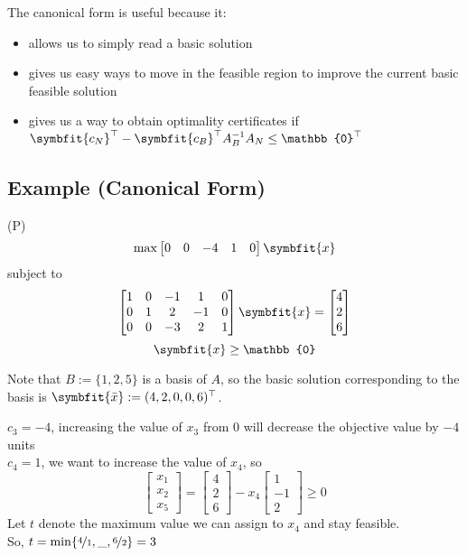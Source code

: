 The canonical form is useful because it:
\begin{itemize}
    \item allows us to simply read a basic solution
    \item gives us easy ways to move in the feasible region to improve the current basic
    feasible solution
    \item gives us a way to obtain optimality certificates if
    $\symbfit{c_N}^\top -\symbfit{c_B}^\top A_B^{-1}A_N\le \mathbb{0}^\top $
\end{itemize}

\subsection{Example (Canonical Form)}
(P)
\[\max \begin{bmatrix}
    0 & 0 & -4 & 1 & 0
\end{bmatrix}\symbfit{x}\]
subject to
\[
    \begin{bmatrix}
        1 & 0 & -1 & 1 & 0\\
        0 & 1 & 2 & -1 & 0\\
        0 & 0 & -3 & 2 & 1
    \end{bmatrix}\symbfit{x}
    =
    \begin{bmatrix}
        4\\
        2\\
        6
    \end{bmatrix} \]
\[ \symbfit{x}\ge \mathbb{0} \]

Note that $B:=\{1,2,5\}$ is a basis of $A$, so the basic solution corresponding to the
basis is
$\symbfit{\bar{x}}:=(4,2,0,0,6)^\top$.

$c_3=-4$, increasing the value of $x_3$ from $0$ will decrease the objective value by $-4$ units\\
$c_4=1$, we want to increase the value of $x_4$, so
\[
    \begin{bmatrix}
        x_1\\
        x_2\\
        x_5
    \end{bmatrix}
    =
    \begin{bmatrix}
        4\\
        2\\
        6
    \end{bmatrix}
    -x_4
    \begin{bmatrix}
        1\\
        -1\\
        2
    \end{bmatrix}
    \ge 0
\]
Let $t$ denote the maximum value we can assign to $x_4$ and stay feasible.\\
So,
$t=\min\{\nicefrac{4}{1},\_,\nicefrac{6}{2}\}=3$